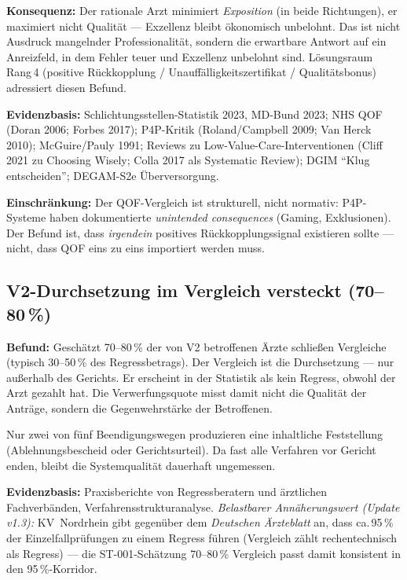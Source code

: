 \documentclass{umbruch-position}
\begin{document}
\textbf{Konsequenz:} Der rationale Arzt minimiert \emph{Exposition} (in beide Richtungen), er maximiert nicht Qualität --- Exzellenz bleibt ökonomisch unbelohnt. Das ist nicht Ausdruck mangelnder Professionalität, sondern die erwartbare Antwort auf ein Anreizfeld, in dem Fehler teuer und Exzellenz unbelohnt sind. Lösungsraum Rang\,4 (positive Rückkopplung / Unauffälligkeitszertifikat / Qualitätsbonus) adressiert diesen Befund.

\textbf{Evidenzbasis:} Schlichtungsstellen-Statistik 2023, MD-Bund 2023; NHS QOF (Doran 2006; Forbes 2017); P4P-Kritik (Roland/Campbell 2009; Van Herck 2010); McGuire/Pauly 1991; Reviews zu Low-Value-Care-Interventionen (Cliff 2021 zu Choosing Wisely; Colla 2017 als Systematic Review); DGIM ``Klug entscheiden''; DEGAM-S2e Überversorgung.

\textbf{Einschr\"ankung:} Der QOF-Vergleich ist strukturell, nicht normativ: P4P-Systeme haben dokumentierte \emph{unintended consequences} (Gaming, Exklusionen). Der Befund ist, dass \emph{irgendein} positives Rückkopplungs\-signal existieren sollte --- nicht, dass QOF eins zu eins importiert werden muss.

\subsection{V2-Durchsetzung im Vergleich versteckt (70--80\,\%)}

\textbf{Befund:} Gesch\"atzt 70--80\,\% der von V2 betroffenen \"Arzte schlie\ss{}en Vergleiche (typisch 30--50\,\% des Regressbetrags). Der Vergleich ist die Durchsetzung --- nur au\ss{}erhalb des Gerichts. Er erscheint in der Statistik als \glqq{}kein Regress\grqq{}, obwohl der Arzt gezahlt hat. Die Verwerfungsquote misst damit nicht die Qualit\"at der Antr\"age, sondern die Gegenwehrst\"arke der Betroffenen.

Nur zwei von f\"unf Beendigungswegen produzieren eine inhaltliche Feststellung (Ablehnungsbescheid oder Gerichtsurteil). Da fast alle Verfahren vor Gericht enden, bleibt die Systemqualit\"at dauerhaft ungemessen.

\textbf{Evidenzbasis:} Praxisberichte von Regressberatern und \"arztlichen Fachverb\"anden, Verfahrensstrukturanalyse. \emph{Belastbarer Annäherungswert (Update v1.3):} KV~Nordrhein gibt gegen\"uber dem \emph{Deutschen \"Arzteblatt} an, dass ca.\,95\,\% der Einzelfallpr\"ufungen zu einem Regress f\"uhren (Vergleich z\"ahlt rechentechnisch als Regress) --- die ST-001-Sch\"atzung 70--80\,\% Vergleich passt damit konsistent in den 95\,\%-Korridor.
\end{document}

